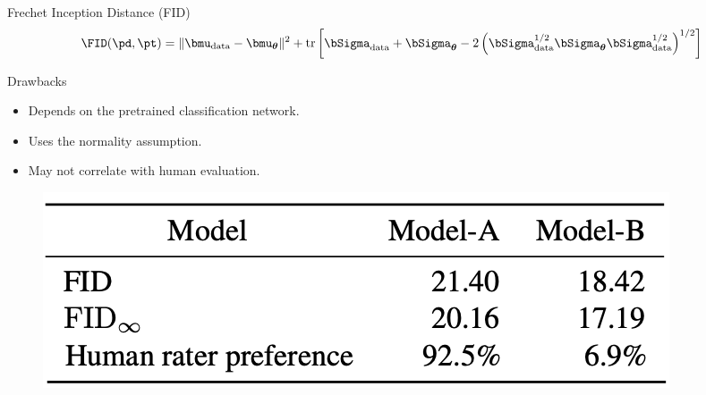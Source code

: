 \documentclass{beamer}
\begin{document}
\begin{frame}{Frechet Inception Distance (FID)}
	\vspace{-0.4cm}
	\[
		\FID (\pd, \pt) = \| \bmu_{\text{data}} - \bmu_{\boldsymbol{\theta}}\|^2 + \text{tr} \left[ \bSigma_{\text{data}} + \bSigma_{\boldsymbol{\theta}} - 2 \left(\bSigma_{\text{data}}^{1/2} \bSigma_{\boldsymbol{\theta}} \bSigma_{\text{data}}^{1/2} \right)^{1/2} \right]
	\]
	\eqpause
	\vspace{-0.3cm}
	\begin{block}{Drawbacks}
		\begin{itemize}
			\item Depends on the pretrained classification network.
			\item Uses the normality assumption.
			\item May not correlate with human evaluation.
		\end{itemize}
	\end{block}
	\begin{figure}
		\includegraphics[width=0.7\linewidth]{figs/fid_vs_human_eval}
	\end{figure}
\end{frame}
\end{document}
